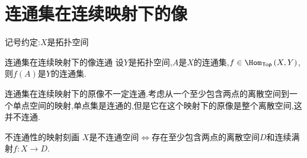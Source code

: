 \section{连通集在连续映射下的像}

记号约定:$X$是拓扑空间

\begin{proposition}{连通集在连续映射下的像连通}{}
	设$Y$是拓扑空间,$A$是$X$的连通集,$f\in\Hom_{\mathsf{Top}}\left(X,Y\right)$,则$f\left(A\right)$是$Y$的连通集.
\end{proposition}

\begin{remark}{}{}
	连通集在连续映射下的原像不一定连通.考虑从一个至少包含两点的离散空间到一个单点空间的映射,单点集是连通的,但是它在这个映射下的原像是整个离散空间,这并不连通.
\end{remark}

\begin{proposition}{不连通性的映射刻画}{}
	$X$是不连通空间$\iff$存在至少包含两点的离散空间$D$和连续满射$f:X\to D$.
\end{proposition}